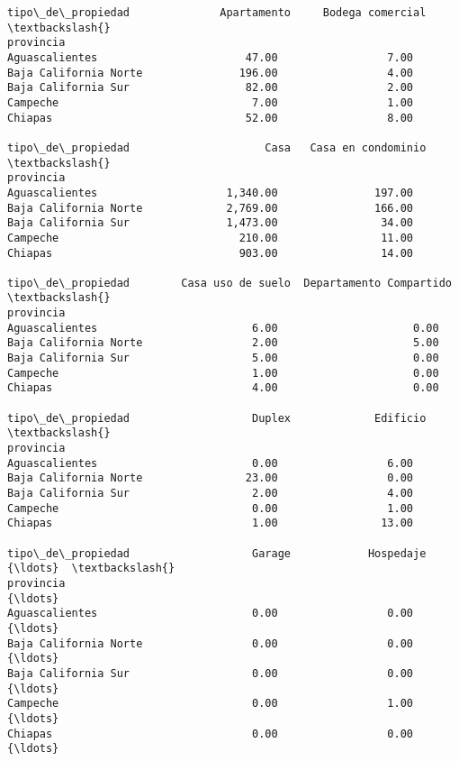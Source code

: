 \documentclass[11pt]{article}
\newcommand{\prompt}[4]{
        \llap{{\color{#2}[#3]: #4}}\vspace{-1.25em}
    }
\begin{document}
            \begin{tcolorbox}[breakable, boxrule=.5pt, size=fbox, pad at break*=1mm, opacityfill=0]
\prompt{Out}{outcolor}{13}{\hspace{3.5pt}}
\begin{Verbatim}[commandchars=\\\{\}]
tipo\_de\_propiedad              Apartamento     Bodega comercial  \textbackslash{}
provincia
Aguascalientes                       47.00                 7.00
Baja California Norte               196.00                 4.00
Baja California Sur                  82.00                 2.00
Campeche                              7.00                 1.00
Chiapas                              52.00                 8.00

tipo\_de\_propiedad                     Casa   Casa en condominio  \textbackslash{}
provincia
Aguascalientes                    1,340.00               197.00
Baja California Norte             2,769.00               166.00
Baja California Sur               1,473.00                34.00
Campeche                            210.00                11.00
Chiapas                             903.00                14.00

tipo\_de\_propiedad        Casa uso de suelo  Departamento Compartido  \textbackslash{}
provincia
Aguascalientes                        6.00                     0.00
Baja California Norte                 2.00                     5.00
Baja California Sur                   5.00                     0.00
Campeche                              1.00                     0.00
Chiapas                               4.00                     0.00

tipo\_de\_propiedad                   Duplex             Edificio  \textbackslash{}
provincia
Aguascalientes                        0.00                 6.00
Baja California Norte                23.00                 0.00
Baja California Sur                   2.00                 4.00
Campeche                              0.00                 1.00
Chiapas                               1.00                13.00

tipo\_de\_propiedad                   Garage            Hospedaje  {\ldots}  \textbackslash{}
provincia                                                        {\ldots}
Aguascalientes                        0.00                 0.00  {\ldots}
Baja California Norte                 0.00                 0.00  {\ldots}
Baja California Sur                   0.00                 0.00  {\ldots}
Campeche                              0.00                 1.00  {\ldots}
Chiapas                               0.00                 0.00  {\ldots}


\end{Verbatim}
\end{tcolorbox}
\end{document}

